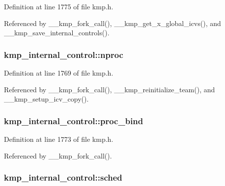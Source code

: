 Definition at line 1775 of file kmp.\-h.



Referenced by \-\_\-\-\_\-kmp\-\_\-fork\-\_\-call(), \-\_\-\-\_\-kmp\-\_\-get\-\_\-x\-\_\-global\-\_\-icvs(), and \-\_\-\-\_\-kmp\-\_\-save\-\_\-internal\-\_\-controls().

\hypertarget{structkmp__internal__control_a807067319fd06b644c3aecefadac01e6}{
\subsubsection[{nproc}]{ kmp\-\_\-internal\-\_\-control\-::nproc}}\label{structkmp__internal__control_a807067319fd06b644c3aecefadac01e6}


Definition at line 1769 of file kmp.\-h.



Referenced by \-\_\-\-\_\-kmp\-\_\-fork\-\_\-call(), \-\_\-\-\_\-kmp\-\_\-reinitialize\-\_\-team(), and \-\_\-\-\_\-kmp\-\_\-setup\-\_\-icv\-\_\-copy().

\hypertarget{structkmp__internal__control_a17ef4ac8abe321e2d0ea11f730be3995}{
\subsubsection[{proc\-\_\-bind}]{ kmp\-\_\-internal\-\_\-control\-::proc\-\_\-bind}}\label{structkmp__internal__control_a17ef4ac8abe321e2d0ea11f730be3995}


Definition at line 1773 of file kmp.\-h.



Referenced by \-\_\-\-\_\-kmp\-\_\-fork\-\_\-call().

\hypertarget{structkmp__internal__control_a39684c4ec5986537da3c14792fd003fb}{
\subsubsection[{sched}]{ kmp\-\_\-internal\-\_\-control\-::sched}}\label{structkmp__internal__control_a39684c4ec5986537da3c14792fd003fb}


